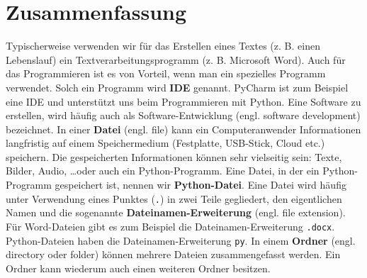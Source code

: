 \section{Zusammenfassung}

Typischerweise verwenden wir für das Erstellen eines Textes (z. B. einen Lebenslauf) ein Textverarbeitungsprogramm (z. B. Microsoft Word). Auch für das Programmieren ist es von Vorteil, wenn man ein spezielles Programm verwendet. Solch ein Programm wird \textbf{\ac{IDE}} genannt. PyCharm ist zum Beispiel eine IDE und unterstützt uns beim Programmieren mit Python. Eine Software zu erstellen, wird häufig auch als Software-Entwicklung (engl. software development) bezeichnet. In einer \textbf{Datei} (engl. file) kann ein Computeranwender Informationen langfristig auf einem Speichermedium (Festplatte, USB-Stick, Cloud etc.) speichern. Die gespeicherten Informationen können sehr vielseitig sein: Texte, Bilder, Audio, \dots oder auch ein Python-Programm. Eine Datei, in der ein Python-Programm gespeichert ist, nennen wir \textbf{Python-Datei}. Eine Datei wird häufig unter Verwendung eines Punktes (\texttt{.}) in zwei Teile gegliedert, den eigentlichen Namen und die sogenannte \textbf{Dateinamen-Erweiterung} (engl. file extension). Für Word-Dateien gibt es zum Beispiel die Dateinamen-Erweiterung \texttt{.docx}. Python-Dateien haben die Dateinamen-Erweiterung \texttt{py}. In einem \textbf{Ordner} (engl. directory oder folder) können mehrere Dateien zusammengefasst werden. Ein Ordner kann wiederum auch einen weiteren Ordner besitzen.